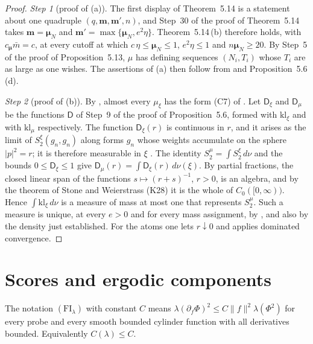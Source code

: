 \documentclass[11pt,letterpaper,reqno]{amsart}
\theoremstyle{definition}
\begin{document}
\begin{proof}
\emph{Step 1} (proof of (a)).
The first display of Theorem~5.14 is a statement about one quadruple $(q,\mathbf m,\mathbf m',n)$, and Step~30 of the proof of Theorem~5.14 takes $\mathbf m=\boldsymbol\mu_N$ and $\mathbf m'=\max\{\boldsymbol\mu_N,e^2\eta\}$.
Theorem~5.14\,(b) therefore holds, with $c_{\boldsymbol\mu}\bar m=c$, at every cutoff at which $c\,\eta\le\boldsymbol\mu_N\le1$, $e^2\eta\le1$ and $n\boldsymbol\mu_N\ge20$.
By Step~5 of the proof of Proposition~5.13, $\mu$ has defining sequences $(N_i,T_i)$ whose $T_i$ are as large as one wishes.
The assertions of (a) then follow from \cite[Proposition~47.1\,(b1), (b5)]{QEDIII} and Proposition~5.6\,(d).

\emph{Step 2} (proof of (b)).
By \cite[Theorem~1.4, Part~I\,(d)--(f)]{QEDII}, almost every $\mu_\xi$ has the form (C7) of \cite[Theorem~44]{QEDIII}.
Let $\mathsf D_\xi$ and $\mathsf D_\mu$ be the functions $\mathsf D$ of Step~9 of the proof of Proposition~5.6, formed with $\mathrm{kl}_\xi$ and with $\mathrm{kl}_\mu$ respectively.
The function $\mathsf D_\xi(r)$ is continuous in $r$, and it arises as the limit of $S_2^\xi(g_n,g_n)$ along forms $g_n$ whose weights accumulate on the sphere $|p|^2=r$; it is therefore measurable in $\xi$ \cite[Proposition~45.6\,(d0)]{QEDIII}.
The identity $S_2^\mu=\int S_2^\xi\,d\nu$ \cite[Proposition~45.6\,(a$'$), (a$''$)]{QEDIII} and the bounds $0\le\mathsf D_\xi\le1$ give $\mathsf D_\mu(r)=\int\mathsf D_\xi(r)\,d\nu(\xi)$.
By partial fractions, the closed linear span of the functions $s\mapsto(r+s)^{-1}$, $r>0$, is an algebra, and by the theorem of Stone and Weierstrass (K28) it is the whole of $C_0([0,\infty))$.
Hence $\int\mathrm{kl}_\xi\,d\nu$ is a measure of mass at most one that represents $S_2^\mu$.
Such a measure is unique, at every $e>0$ and for every mass assignment, by \cite[Theorem~1.4, Part~I\,(d)]{QEDII}, and also by the density just established.
For the atoms one lets $r\downarrow0$ and applies dominated convergence.

\end{proof}


\section{Scores and ergodic components}

The notation $(\mathrm{FI}_\lambda)$ with constant $C$ means
$\lambda(\partial_f\Phi)^2\le C\|f\|^2\lambda(\Phi^2)$ for every
probe and every smooth bounded cylinder function with all derivatives bounded.
Equivalently $C(\lambda)\le C$.
\end{document}
